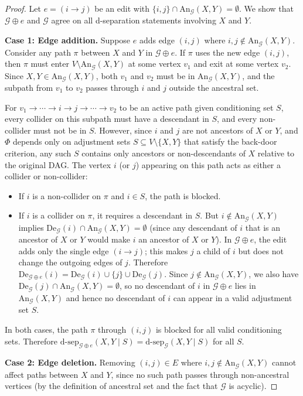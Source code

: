\documentclass[11pt,a4paper]{article}
\theoremstyle{definition}
\theoremstyle{remark}
\newcommand{\DAG}{\mathcal{G}}
\newcommand{\An}{\mathrm{An}}
\newcommand{\De}{\mathrm{De}}
\newcommand{\dsep}{\mathrm{d\text{-}sep}}
\newcommand{\Phi}{\varPhi}
\begin{document}
\begin{proof}
Let $e = (i \to j)$ be an edit with $\{i, j\} \cap \An_\DAG(X, Y) = \emptyset$. We
show that $\DAG \oplus e$ and $\DAG$ agree on all d-separation statements involving
$X$ and $Y$.

\textbf{Case 1: Edge addition.} Suppose $e$ adds edge $(i, j)$ where $i, j \notin
\An_\DAG(X,Y)$. Consider any path $\pi$ between $X$ and $Y$ in $\DAG \oplus e$.
If $\pi$ uses the new edge $(i, j)$, then $\pi$ must enter $V \setminus \An_\DAG(X,Y)$
at some vertex $v_1$ and exit at some vertex $v_2$. Since $X, Y \in \An_\DAG(X,Y)$,
both $v_1$ and $v_2$ must be in $\An_\DAG(X,Y)$, and the subpath from $v_1$ to $v_2$
passes through $i$ and $j$ outside the ancestral set.

For $v_1 \to \cdots \to i \to j \to \cdots \to v_2$ to be an active path given
conditioning set $S$, every collider on this subpath must have a descendant in $S$, and
every non-collider must not be in $S$. However, since $i$ and $j$ are not ancestors of
$X$ or $Y$, and $\Phi$ depends only on adjustment sets $S \subseteq V \setminus \{X,Y\}$
that satisfy the back-door criterion, any such $S$ contains only ancestors or non-descendants
of $X$ relative to the original DAG. The vertex $i$ (or $j$) appearing on this path acts
as either a collider or non-collider:
\begin{itemize}
  \item If $i$ is a non-collider on $\pi$ and $i \in S$, the path is blocked.
  \item If $i$ is a collider on $\pi$, it requires a descendant in $S$. But $i \notin
    \An_\DAG(X,Y)$ implies $\De_\DAG(i) \cap \An_\DAG(X,Y) = \emptyset$ (since any
    descendant of $i$ that is an ancestor of $X$ or $Y$ would make $i$ an ancestor of
    $X$ or $Y$). In $\DAG \oplus e$, the edit adds only the single edge $(i \to j)$;
    this makes $j$ a child of $i$ but does not change the outgoing edges of $j$.
    Therefore $\De_{\DAG \oplus e}(i) = \De_\DAG(i) \cup \{j\} \cup \De_\DAG(j)$.
    Since $j \notin \An_\DAG(X,Y)$, we also have
    $\De_\DAG(j) \cap \An_\DAG(X,Y) = \emptyset$, so no descendant of $i$
    in $\DAG \oplus e$ lies in $\An_\DAG(X,Y)$ and hence no descendant of $i$ can
    appear in a valid adjustment set $S$.
\end{itemize}
In both cases, the path $\pi$ through $(i,j)$ is blocked for all valid conditioning sets.
Therefore $\dsep_{\DAG \oplus e}(X, Y \mid S) = \dsep_\DAG(X, Y \mid S)$ for all $S$.

\textbf{Case 2: Edge deletion.} Removing $(i, j) \in E$ where $i, j \notin
\An_\DAG(X,Y)$ cannot affect paths between $X$ and $Y$, since no such path passes
through non-ancestral vertices (by the definition of ancestral set and the fact that
$\DAG$ is acyclic).


\end{proof}
\end{document}

